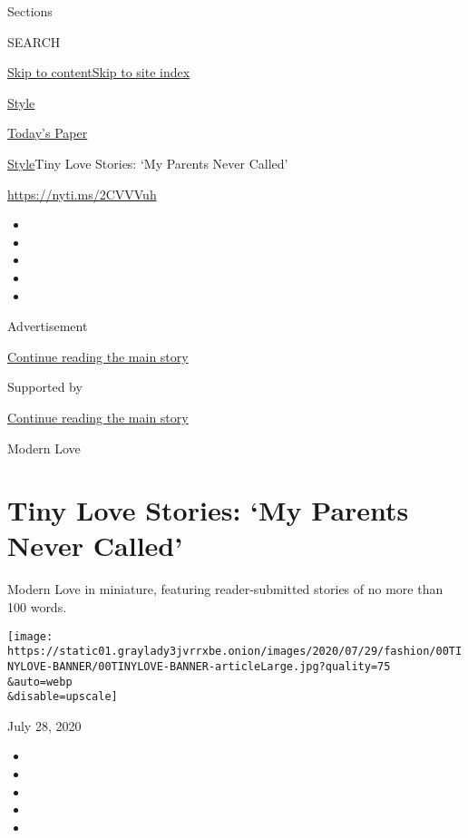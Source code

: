 Sections

SEARCH

\protect\hyperlink{site-content}{Skip to
content}\protect\hyperlink{site-index}{Skip to site index}

\href{https://www.nytimes3xbfgragh.onion/section/style}{Style}

\href{https://myaccount.nytimes3xbfgragh.onion/auth/login?response_type=cookie\&client_id=vi}{}

\href{https://www.nytimes3xbfgragh.onion/section/todayspaper}{Today's
Paper}

\href{/section/style}{Style}\textbar{}Tiny Love Stories: `My Parents
Never Called'

\url{https://nyti.ms/2CVVVuh}

\begin{itemize}
\item
\item
\item
\item
\item
\end{itemize}

Advertisement

\protect\hyperlink{after-top}{Continue reading the main story}

Supported by

\protect\hyperlink{after-sponsor}{Continue reading the main story}

Modern Love

\hypertarget{tiny-love-stories-my-parents-never-called}{%
\section{Tiny Love Stories: `My Parents Never
Called'}\label{tiny-love-stories-my-parents-never-called}}

Modern Love in miniature, featuring reader-submitted stories of no more
than 100 words.

\texttt{[image: https://static01.graylady3jvrrxbe.onion/images/2020/07/29/fashion/00TINYLOVE-BANNER/00TINYLOVE-BANNER-articleLarge.jpg?quality=75\\\&auto=webp\\\&disable=upscale]}

July 28, 2020

\begin{itemize}
\item
\item
\item
\item
\item
\end{itemize}

